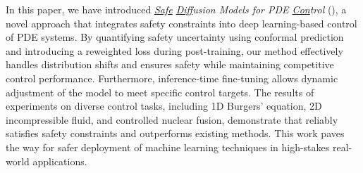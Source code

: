 In this paper, we have introduced \emph{\underline{Safe} \underline{Diff}usion Models for PDE \underline{Con}trol} (\proj), a novel approach that integrates safety constraints into deep learning-based control of PDE systems. By quantifying safety uncertainty using conformal prediction and introducing a reweighted loss during post-training, our method effectively handles distribution shifts and ensures safety while maintaining competitive control performance. Furthermore, inference-time fine-tuning allows dynamic adjustment of the model to meet specific control targets. The results of experiments on diverse control tasks, including 1D Burgers’ equation, 2D incompressible fluid, and controlled nuclear fusion, demonstrate that \proj reliably satisfies safety constraints and outperforms existing methods. This work paves the way for safer deployment of machine learning techniques in high-stakes real-world applications.

